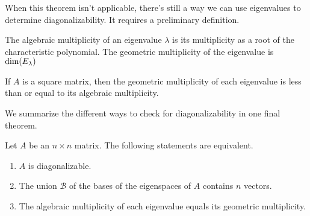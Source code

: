 \documentclass[../m073main.tex]{subfiles}
\begin{document}
When this theorem isn't applicable, there's still a way we can use eigenvalues to determine diagonalizability.
It requires a preliminary definition.

\begin{definition}
	The algebraic multiplicity of an eigenvalue $\lambda$ is its multiplicity as a root of the characteristic polynomial.
	The geometric multiplicity of the eigenvalue is $\textrm{dim} (E_\lambda)$
\end{definition}

\begin{lemma}
	If $A$ is a square matrix, then the geometric multiplicity of each eigenvalue is less than or equal to its algebraic multiplicity.
\end{lemma}

We summarize the different ways to check for diagonalizability in one final theorem.

\begin{theorem}
	Let $A$ be an $n \times n$ matrix.
	The following statements are equivalent.
	\begin{enumerate}[label=(\alph*)]
		\item $A$ is diagonalizable.
		\item The union $\mathcal{B}$ of the bases of the eigenspaces of $A$ contains $n$ vectors.
		\item The algebraic multiplicity of each eigenvalue equals its geometric multiplicity.
	\end{enumerate}
\end{theorem}
\end{document}
